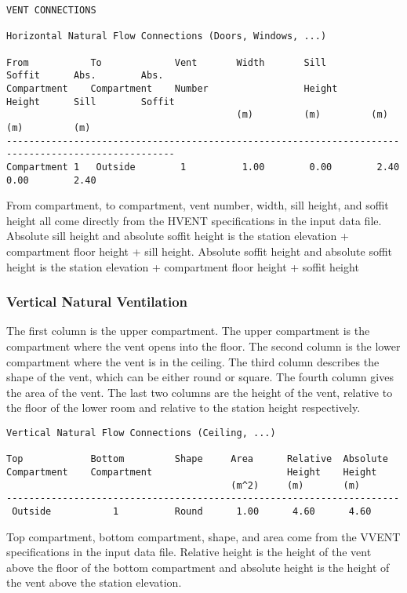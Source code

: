 \begin{lstlisting}[basicstyle=\scriptsize]
VENT CONNECTIONS

Horizontal Natural Flow Connections (Doors, Windows, ...)

From           To             Vent       Width       Sill        Soffit      Abs.        Abs.
Compartment    Compartment    Number                 Height      Height      Sill        Soffit
                                         (m)         (m)         (m)         (m)         (m)
----------------------------------------------------------------------------------------------------
Compartment 1   Outside        1          1.00        0.00        2.40        0.00        2.40
\end{lstlisting}
From compartment, to compartment, vent number, width, sill height, and soffit height all come directly from the HVENT specifications in the input data file. Absolute sill height and absolute soffit height is the station elevation + compartment floor height + sill height. Absolute soffit height and absolute soffit height is the station elevation + compartment floor height + soffit height

\subsubsection{Vertical Natural Ventilation}

The first column is the upper compartment.  The upper compartment is the compartment where the vent opens into the floor.  The second column is the lower compartment where the vent is in the ceiling.  The third column describes the shape of the vent, which can be either round or square.  The fourth column gives the area of the vent.  The last two columns are the height of the vent, relative to the floor of the lower room and relative to the station height respectively.
\begin{lstlisting}[basicstyle=\scriptsize]
Vertical Natural Flow Connections (Ceiling, ...)

Top            Bottom         Shape     Area      Relative  Absolute
Compartment    Compartment                        Height    Height
                                        (m^2)     (m)       (m)
----------------------------------------------------------------------
 Outside           1          Round      1.00      4.60      4.60
\end{lstlisting}
Top compartment, bottom compartment, shape, and area come from the VVENT specifications in the input data file. Relative height is the height of the vent above the floor of the bottom compartment and absolute height is the height of the vent above the station elevation.

